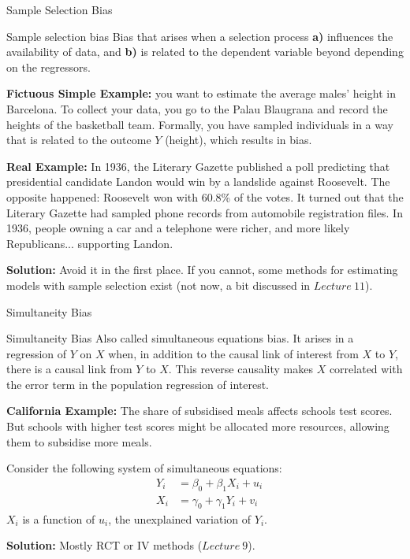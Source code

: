 \documentclass[notes,10pt, aspectratio=169]{beamer}
\begin{document}
\begin{frame}{Sample Selection Bias}

\begin{block}{Sample selection bias}
Bias that arises when a selection process \textbf{a)} influences the availability of data, and  \textbf{b)} is related to the dependent variable beyond depending on the regressors.
\end{block}
\vspace{1em}
\textbf{Fictuous Simple Example:} you want to estimate the average males' height in Barcelona. To collect your data, you go to the Palau Blaugrana and record the heights of the basketball team. Formally, you have sampled individuals in a way that is related to the outcome $Y$ (height), which results in bias.

\vspace{1em}

\textbf{Real Example:} In 1936, the Literary Gazette published a poll predicting that presidential candidate Landon would win by a landslide against Roosevelt. The opposite happened: Roosevelt won with 60.8\% of the votes. It turned out that the Literary Gazette had sampled phone records from automobile registration files. In 1936, people owning a car and a telephone were richer, and more likely Republicans... supporting Landon.

\vspace{1em}

\textbf{Solution:} Avoid it in the first place. If you cannot, some methods for estimating models with sample selection exist (not now,  a bit discussed in $Lecture~11$).
\end{frame}

\begin{frame}{Simultaneity Bias}
\begin{block}{Simultaneity Bias}
Also called simultaneous equations bias. It arises in a regression of $Y$ on $X$ when, in addition to the causal link of interest from $X$ to $Y$, there is a causal link from $Y$ to $X$. This reverse causality makes $X$ correlated with the error term in the population regression of interest.
\end{block}
\vspace{1em}
\textbf{California Example:} The share of subsidised meals affects schools test scores. But schools with higher test scores might be allocated more resources, allowing them to subsidise more meals.

\vspace{1em}

Consider the following system of simultaneous equations:
\begin{eqnarray*}
    &Y_i &= \beta_0 + \beta_1 X_i + u_i\\
    &X_i &= \gamma_0 + \gamma_1 Y_i + v_i
\end{eqnarray*}
$X_i$ is a function of $u_i$, the unexplained variation of $Y_i$.

\vspace{1em}

\textbf{Solution:} Mostly RCT or IV methods ($Lecture~9$).
\end{frame}
\end{document}
